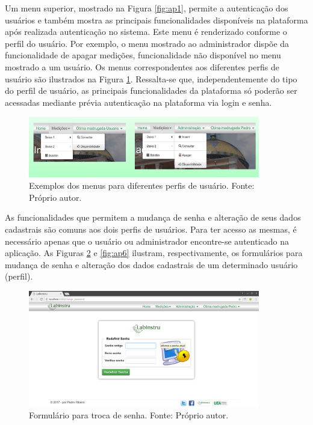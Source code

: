Um menu superior, mostrado na Figura \ref{fig:ap1}, permite a autenticação dos usuários e também mostra as principais funcionalidades disponíveis na plataforma após realizada autenticação no sistema. Este menu é renderizado conforme o perfil do usuário. Por exemplo, o menu mostrado ao administrador dispõe da funcionalidade de apagar medições, funcionalidade não disponível no menu mostrado a um usuário. Os menus correspondentes aos diferentes perfis de usuário são ilustrados na Figura \ref{fig:ap8}. Ressalta-se que, independentemente do tipo do perfil de usuário, as principais funcionalidades da plataforma só poderão ser acessadas mediante prévia autenticação na plataforma via login e senha.

\begin{figure}[h!]
	\centering
	\includegraphics[width=0.9\textwidth]{./img/ap8.png}
	\caption{Exemplos dos menus para diferentes perfis de usuário. Fonte: Próprio autor.} \label{fig:ap8}
\end{figure}

As funcionalidades que permitem a mudança de senha e alteração de seus dados cadastrais são comuns aos dois perfis de usuários. Para ter acesso as mesmas, é necessário apenas que o usuário ou administrador encontre-se autenticado na aplicação. As Figuras \ref{fig:ap5} e \ref{fig:ap6} ilustram, respectivamente, os formulários para mudança de senha e alteração dos dados cadastrais de um determinado usuário (perfil).

\begin{figure}[h!]
	\centering
	\includegraphics[width=0.9\textwidth]{./img/ap5.png}
	\caption{Formulário para troca de senha. Fonte: Próprio autor.} \label{fig:ap5}
\end{figure}

